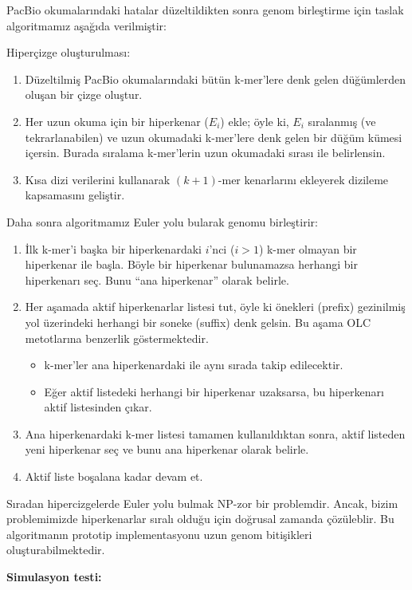 PacBio okumalarındaki hatalar düzeltildikten sonra genom birleştirme için taslak algoritmamız aşağıda verilmiştir:

Hiperçizge oluşturulması:

\begin{enumerate} 
\item Düzeltilmiş PacBio okumalarındaki bütün k-mer'lere denk gelen düğümlerden oluşan bir çizge oluştur.
\item Her uzun okuma için bir hiperkenar ($E_i$) ekle; öyle ki, $E_i$ sıralanmış (ve tekrarlanabilen) ve uzun okumadaki k-mer'lere denk gelen
bir düğüm kümesi içersin. Burada sıralama k-mer'lerin uzun okumadaki sırası ile belirlensin.
\item Kısa dizi verilerini kullanarak $(k+1)$-mer kenarlarını ekleyerek dizileme kapsamasını geliştir.
\end{enumerate}


Daha sonra algoritmamız Euler yolu bularak genomu birleştirir:

\begin{enumerate}
\item İlk k-mer'i başka bir hiperkenardaki $i$'nci ($i>1$) k-mer olmayan bir hiperkenar ile başla. Böyle bir hiperkenar bulunamazsa herhangi bir hiperkenarı seç.
Bunu ``ana hiperkenar'' olarak belirle.
\item Her aşamada aktif hiperkenarlar listesi tut, öyle ki önekleri (prefix) gezinilmiş yol üzerindeki herhangi bir soneke (suffix) denk gelsin. Bu aşama OLC metotlarına
benzerlik göstermektedir.
\begin{itemize}
\item k-mer'ler ana hiperkenardaki ile aynı sırada takip edilecektir.
\item Eğer aktif listedeki herhangi bir hiperkenar uzaksarsa, bu hiperkenarı aktif listesinden çıkar.
\end{itemize}
\item Ana hiperkenardaki k-mer listesi tamamen kullanıldıktan sonra, aktif listeden yeni hiperkenar seç ve bunu ana hiperkenar olarak belirle.
\item Aktif liste boşalana kadar devam et.
\end{enumerate}

Sıradan hipercizgelerde Euler yolu bulmak NP-zor bir problemdir. Ancak, bizim problemimizde hiperkenarlar sıralı olduğu için doğrusal zamanda çözüleblir. Bu algoritmanın prototip implementasyonu uzun genom bitişikleri oluşturabilmektedir.

{\bf Simulasyon testi:}

